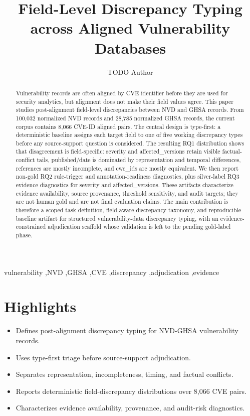 \documentclass[preprint,review,12pt]{elsarticle}
\begin{document}
\begin{frontmatter}
\title{Field-Level Discrepancy Typing across Aligned Vulnerability Databases}
\author{TODO Author}
\address{TODO affiliation}
\begin{abstract}
Vulnerability records are often aligned by CVE identifier before they are used for security analytics, but alignment does not make their field values agree. This paper studies post-alignment field-level discrepancies between NVD and GHSA records. From 100,032 normalized NVD records and 28,785 normalized GHSA records, the current corpus contains 8,066 CVE-ID aligned pairs. The central design is type-first: a deterministic baseline assigns each target field to one of five working discrepancy types before any source-support question is considered. The resulting RQ1 distribution shows that disagreement is field-specific: severity and affected\_versions retain visible factual-conflict tails, published/date is dominated by representation and temporal differences, references are mostly incomplete, and cwe\_ids are mostly equivalent. We then report non-gold RQ2 rule-trigger and annotation-readiness diagnostics, plus silver-label RQ3 evidence diagnostics for severity and affected\_versions. These artifacts characterize evidence availability, source provenance, threshold sensitivity, and audit targets; they are not human gold and are not final evaluation claims. The main contribution is therefore a scoped task definition, field-aware discrepancy taxonomy, and reproducible baseline artifact for structured vulnerability-data discrepancy typing, with an evidence-constrained adjudication scaffold whose validation is left to the pending gold-label phase.
\end{abstract}
\begin{keyword}
vulnerability \sep NVD \sep GHSA \sep CVE \sep discrepancy \sep adjudication \sep evidence
\end{keyword}
\end{frontmatter}

\section*{Highlights}
\begin{itemize}
\item Defines post-alignment discrepancy typing for NVD-GHSA vulnerability records.
\item Uses type-first triage before source-support adjudication.
\item Separates representation, incompleteness, timing, and factual conflicts.
\item Reports deterministic field-discrepancy distributions over 8,066 CVE pairs.
\item Characterizes evidence availability, provenance, and audit-risk diagnostics.
\end{itemize}
\end{document}
